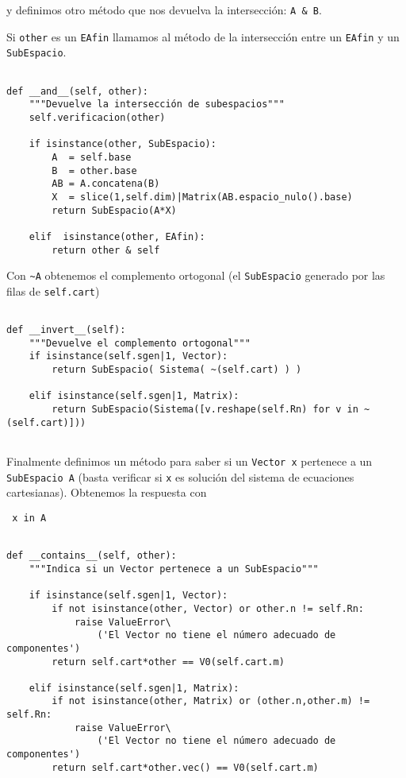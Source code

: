 \documentclass[11pt]{report}
\begin{document}
y definimos otro método que nos devuelva la intersección: \texttt{A \& B}. 

Si \texttt{other} es un \texttt{EAfin} llamamos al método de la intersección entre
un \texttt{EAfin} y un \texttt{SubEspacio}.

\begin{verbatim}

def __and__(self, other):
    """Devuelve la intersección de subespacios"""
    self.verificacion(other)
    
    if isinstance(other, SubEspacio):
        A  = self.base
        B  = other.base
        AB = A.concatena(B)
        X  = slice(1,self.dim)|Matrix(AB.espacio_nulo().base)
        return SubEspacio(A*X)
    
    elif  isinstance(other, EAfin):
        return other & self

\end{verbatim}

Con \texttt{\textasciitilde{}A} obtenemos el complemento ortogonal (el \texttt{SubEspacio} generado
por las filas de \texttt{self.cart})

\begin{verbatim}

def __invert__(self):
    """Devuelve el complemento ortogonal"""
    if isinstance(self.sgen|1, Vector):
        return SubEspacio( Sistema( ~(self.cart) ) )
    
    elif isinstance(self.sgen|1, Matrix):
        return SubEspacio(Sistema([v.reshape(self.Rn) for v in ~(self.cart)]))
    
\end{verbatim}

\noindent Finalmente definimos un método para saber si un \texttt{Vector x}
pertenece a un \texttt{SubEspacio A} (basta verificar si \texttt{x} es solución del
sistema de ecuaciones cartesianas). Obtenemos la respuesta con
\begin{center}
  \Verb/ x in A /
\end{center}

\begin{verbatim}

def __contains__(self, other):
    """Indica si un Vector pertenece a un SubEspacio"""

    if isinstance(self.sgen|1, Vector):
        if not isinstance(other, Vector) or other.n != self.Rn:
            raise ValueError\
                ('El Vector no tiene el número adecuado de componentes')
        return self.cart*other == V0(self.cart.m)
    
    elif isinstance(self.sgen|1, Matrix):
        if not isinstance(other, Matrix) or (other.n,other.m) != self.Rn:
            raise ValueError\
                ('El Vector no tiene el número adecuado de componentes')        
        return self.cart*other.vec() == V0(self.cart.m)
    

\end{verbatim}
\end{document}
